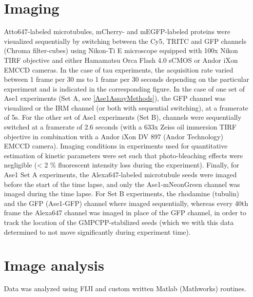 \section{Imaging}
Atto647-labeled microtubules, mCherry- and mEGFP-labeled proteins were visualized sequentially by switching between the Cy5, TRITC and GFP channels (Chroma filter-cubes) using Nikon-Ti E microscope equipped with 100x Nikon TIRF objective and either Hamamatsu Orca Flash 4.0 sCMOS or Andor iXon EMCCD cameras. In the case of tau experiments, the acquisition rate varied between 1 frame per 30 ms to 1 frame per 30 seconds depending on the particular experiment and is indicated in the corresponding figure. In the case of one set of Ase1 experiments (Set A, see \autoref{Ase1AssayMethods}), the GFP channel was visualized or the IRM channel (or both with sequential switching), at a framerate of 5s. For the other set of Ase1 experiments (Set B), channels were sequentially switched at a framerate of 2.6 seconds (with a 633x Zeiss oil immersion TIRF objective in combination with a Andor iXon DV 897 (Andor Technology) EMCCD camera). Imaging conditions in experiments used for quantitative estimation of kinetic parameters were set such that photo-bleaching effects were negligible (< 2 \% fluorescent intensity loss during the experiment). Finally, for Ase1 Set A experiments, the Alexa647-labeled microtubule seeds were imaged before the start of the time lapse, and only the Ase1-mNeonGreen channel was imaged during the time lapse. For Set B experiments, the rhodamine (tubulin) and the GFP (Ase1-GFP) channel where imaged sequentially, whereas every 40th frame the Alexa647 channel was imaged in place of the GFP channel, in order to track the location of the GMPCPP-stabilized seeds (which we with this data determined to not move significantly during experiment time). 

\section{Image analysis}
\label{methods_analysis}
Data was analyzed using FIJI \parencite{Schindelin2012} and custom written Matlab (Mathworks) routines. 
